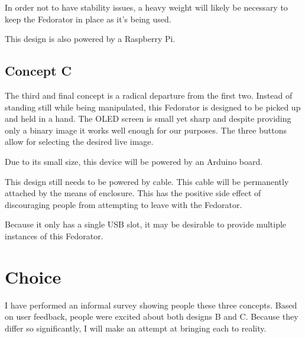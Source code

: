             In order not to have stability issues, a heavy weight will likely be necessary to keep the Fedorator in place as it's being used.
            
            This design is also powered by a Raspberry Pi.
        \subsection{Concept C}
            The third and final concept is a radical departure from the first two.  Instead of standing still while being manipulated, this Fedorator is designed to be picked up and held in a hand.  The OLED screen is small yet sharp and despite providing only a binary image it works well enough for our purposes.  The three buttons allow for selecting the desired live image.
            
            Due to its small size, this device will be powered by an Arduino board.
            
            This design still needs to be powered by cable.  This cable will be permanently attached by the means of enclosure.  This has the positive side effect of discouraging people from attempting to leave with the Fedorator.
            
            Because it only has a single USB slot, it may be desirable to provide multiple instances of this Fedorator.
    \section{Choice}
        I have performed an informal survey showing people these three concepts.  Based on user feedback, people were excited about both designs B and C.  Because they differ so significantly, I will make an attempt at bringing each to reality.
